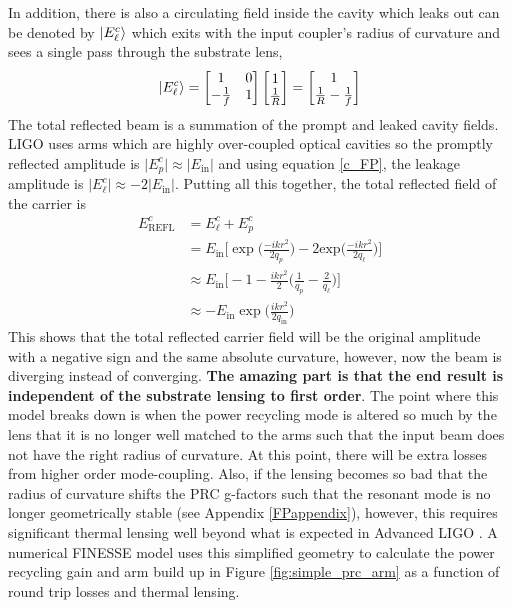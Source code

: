 		In addition, there is also a circulating field inside the cavity which leaks out can be denoted by $\ket{E^c_{\ell}}$ which exits with the input coupler's radius of curvature and sees a single pass through the substrate lens,
		\begin{equation}\label{eq:leakE}
		\ket{E^c_{\ell}} = 		 
		\begin{bmatrix}
		1 	&	0 
		\\ 	-\frac{1}{f} 	&	1
		\end{bmatrix}
		\begin{bmatrix}
		1  
		\\ 	\frac{1}{R}
		\end{bmatrix}
		=
		\begin{bmatrix}
		1  
		\\ 	\frac{1}{R} - \frac{1}{f}
		\end{bmatrix}
		\end{equation}
		The total reflected beam is a summation of the prompt and leaked cavity fields.  LIGO uses arms which are highly over-coupled optical cavities so the promptly reflected amplitude is $\vert E^c_p \vert \approx \vert E_{\text{in}} \vert$ and using equation \ref{c_FP}, the leakage amplitude is $\vert E^c_\ell \vert \approx -2\vert E_{\text{in}} \vert$.  Putting all this together, the total reflected field of the carrier is
		\begin{equation}
		\begin{aligned}
		E^c_{\text{REFL}} 	&= E^c_{\ell} + E^c_p \\
							&= E_{\text{in}} \bigg[ \exp \bigg(\frac{-ik r^2}{2q_p}\bigg) - 2  \text{exp} \bigg(\frac{-ik r^2}{2q_{\ell}}\bigg) \bigg]\\
							&\approx E_{\text{in}} \bigg[ -1 - \frac{ikr^2}{2} \bigg( \frac{1}{q_p} - \frac{2}{q_\ell} \bigg) \bigg]\\
							&\approx -E_{\text{in}} \exp\bigg(\frac{ikr^2}{2q_{\text{in}}}\bigg) 
		\end{aligned} 
		\end{equation}
		This shows that the total reflected carrier field will be the original amplitude with a negative sign and the same absolute curvature, however, now the beam is diverging instead of converging.  \textbf{The amazing part is that the end result is independent of the substrate lensing to first order}.  The point where this model breaks down is when the power recycling mode is altered so much by the lens that it is no longer well matched to the arms such that the input beam does not have the right radius of curvature.  At this point, there will be extra losses from higher order mode-coupling.  Also, if the lensing becomes so bad that the radius of curvature shifts the PRC g-factors such that the resonant mode is no longer geometrically stable (see Appendix \ref{FPappendix}), however, this requires significant thermal lensing well beyond what is expected in Advanced LIGO \cite{Lawrence_TCS}.  A numerical FINESSE model uses this simplified geometry to calculate the power recycling gain and arm build up in Figure \ref{fig:simple_prc_arm} as a function of round trip losses and thermal lensing.
